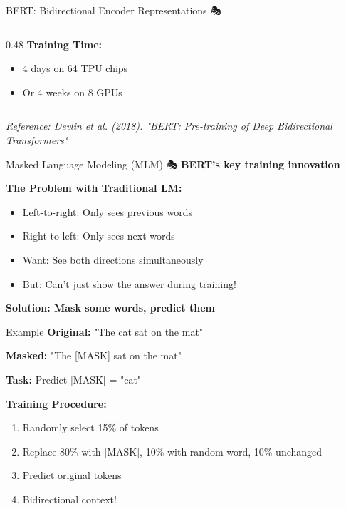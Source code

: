 \documentclass[aspectratio=169]{beamer}
\begin{document}
\begin{frame}[shrink=10]{BERT: Bidirectional Encoder Representations 🎭}
\begin{columns}[T]
\begin{column}{0.48\textwidth}
\vspace{0.5em}
\textbf{Training Time:}
\begin{itemize}\setlength{\itemsep}{0pt}
    \item 4 days on 64 TPU chips
    \item Or 4 weeks on 8 GPUs
\end{itemize}
\end{column}
\end{columns}

\vspace{0.5em}
\small
\textit{Reference: Devlin et al. (2018). "BERT: Pre-training of Deep Bidirectional Transformers"}
\end{frame}

\begin{frame}[shrink=10]{Masked Language Modeling (MLM) 🎭}
\textbf{BERT's key training innovation}

\vspace{1em}

\textbf{The Problem with Traditional LM:}
\begin{itemize}\setlength{\itemsep}{0pt}
    \item Left-to-right: Only sees previous words
    \item Right-to-left: Only sees next words
    \item Want: See both directions simultaneously
    \item But: Can't just show the answer during training!
\end{itemize}

\vspace{1em}

\textbf{Solution: Mask some words, predict them}

\vspace{0.5em}

\begin{exampleblock}{Example}
\textbf{Original:} "The cat sat on the mat"

\textbf{Masked:} "The [MASK] sat on the mat"

\textbf{Task:} Predict [MASK] = "cat"
\end{exampleblock}

\vspace{1em}

\textbf{Training Procedure:}
\begin{enumerate}\setlength{\itemsep}{0pt}
    \item Randomly select 15\% of tokens
    \item Replace 80\% with [MASK], 10\% with random word, 10\% unchanged
    \item Predict original tokens
    \item Bidirectional context!
\end{enumerate}
\end{frame}
\end{document}
